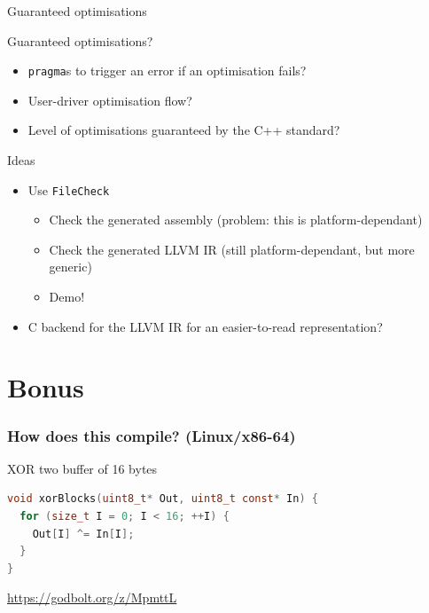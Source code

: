 \begin{frame}{Guaranteed optimisations}
  \begin{block}{Guaranteed optimisations?}
    \begin{itemize}
      \item {\tt pragma}s to trigger an error if an optimisation fails?
      \item User-driver optimisation flow?
      \item Level of optimisations guaranteed by the C++ standard?
    \end{itemize}
  \end{block}

  \pause
  \begin{alertblock}{Ideas}
    \begin{itemize}
      \item Use {\tt FileCheck}
        \begin{itemize}
          \item Check the generated assembly (problem: this is platform-dependant)
          \item Check the generated LLVM IR (still platform-dependant, but more generic)
          \item Demo!
        \end{itemize}
      \item C backend for the LLVM IR for an easier-to-read representation?
    \end{itemize}
  \end{alertblock}
\end{frame}

\section{Bonus}

\begin{frame}[fragile]
  \frametitle{How does this compile? (Linux/x86-64)}

  \begin{block}{XOR two buffer of 16 bytes}
    \begin{lstlisting}[language=c]
void xorBlocks(uint8_t* Out, uint8_t const* In) {
  for (size_t I = 0; I < 16; ++I) {
    Out[I] ^= In[I];
  }
}
    \end{lstlisting}
  \end{block}

  \begin{center}
    \url{https://godbolt.org/z/MpmttL}
  \end{center}
\end{frame}

